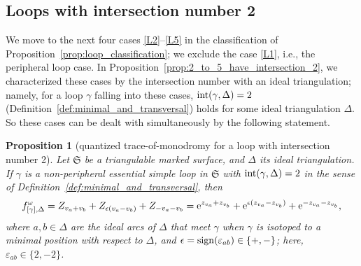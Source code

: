 \documentclass[10pt,a4paper]{amsart}
\numberwithin{equation}{section}
\newtheorem{Proposition}[Theorem]{Proposition}
\theoremstyle{definition}
\begin{document}
\subsection{Loops with intersection number 2}\label{subsec:loops_with_intersection_number_2}
We move to the next four cases \ref{L2}--\ref{L5} in the classification of Proposition~\ref{prop:loop_classification}; we exclude the case \ref{L1}, i.e., the peripheral loop case. In Proposition~\ref{prop:2_to_5_have_intersection_2}, we characterized these cases by the intersection number with an ideal triangulation; namely, for a loop $\gamma$ falling into these cases, ${\rm int}(\gamma,\Delta)=2$ (Definition~\ref{def:minimal_and_transversal}) holds for some ideal triangulation $\Delta$.
So these cases can be dealt with simultaneously by the following statement.
\begin{Proposition}[quantized trace-of-monodromy for a loop with intersection number 2]
\label{prop:quantized_trace-of-monodromy_for_loop_with_int_2}
Let $\mathfrak{S}$ be a triangulable marked surface, and $\Delta$ its ideal triangulation. If $\gamma$ is a non-peripheral essential simple loop in $\mathfrak{S}$ with ${\rm int}(\gamma,\Delta)=2$ in the sense of Definition~{\rm \ref{def:minimal_and_transversal}}, then
\begin{align*}
f^\omega_{[\gamma],\Delta} = Z_{v_a + v_b} + Z_{\epsilon(v_a - v_b)} + Z_{-v_a-v_b}
 = {\rm e}^{z_{v_a} + z_{v_b}} + {\rm e}^{\epsilon(z_{v_a} - z_{v_b})} + {\rm e}^{-z_{v_a} - z_{v_b}},
\end{align*}
where $a,b \in \Delta$ are the ideal arcs of $\Delta$ that meet $\gamma$ when $\gamma$ is isotoped to a minimal position with respect to $\Delta$, and $\epsilon = {\rm sign}(\varepsilon_{ab}) \in \{+,-\}$; here, $\varepsilon_{ab} \in \{2,-2\}$.
\end{Proposition}
\end{document}
